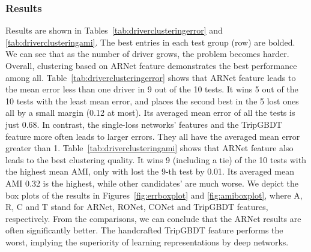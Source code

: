 \documentclass{article}
\begin{document}
\subsubsection{Results}
Results are shown in Tables~\ref{tab:driverclusteringerror} and \ref{tab:driverclusteringami}.
The best entries in each test group (row) are bolded.
We can see that as the number of driver grows, the problem becomes harder.
Overall, clustering based on ARNet feature demonstrates the best performance among all.
Table~\ref{tab:driverclusteringerror} shows that ARNet feature leads to the mean error less than one driver in 9 out of the 10 tests.
It wins 5 out of the 10 tests with the least mean error, and places the second best in the 5 lost ones all by a small margin (0.12 at most).
Its averaged mean error of all the tests is just 0.68.
In contrast, the single-loss networks' features and the TripGBDT feature more often leads to larger errors. They all have the averaged mean error greater than 1.
Table~\ref{tab:driverclusteringami} shows that ARNet feature also leads to the best clustering quality.
It wins 9 (including a tie) of the 10 tests with the highest mean AMI, only with lost the 9-th test by 0.01.
Its averaged mean AMI 0.32 is the highest, while other candidates' are much worse.
We depict the box plots of the results in Figures~\ref{fig:errboxplot} and \ref{fig:amiboxplot}, where A, R, C and T stand for ARNet, RONet, CONet and TripGBDT features, respectively.
From the comparisons, we can conclude that the ARNet results are often significantly better.
The handcrafted TripGBDT feature performs the worst, implying the superiority of learning representations by deep networks. %
\end{document}
